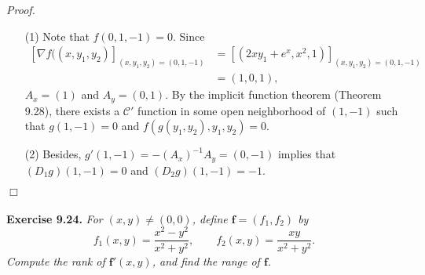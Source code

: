 \documentclass{article}
\begin{document}
\emph{Proof.}
\begin{enumerate}
\item[(1)]
  Note that $f(0,1,-1) = 0$.
  Since
  \begin{align*}
    \left[ \nabla f((x,y_1,y_2) \right]_{(x,y_1,y_2)=(0,1,-1)}
    &= \left[ (2xy_1 + e^x, x^2, 1) \right]_{(x,y_1,y_2)=(0,1,-1)} \\
    &= (1,0,1),
  \end{align*}
  $A_x = (1)$ and $A_y = (0,1)$.
  By the implicit function theorem (Theorem 9.28),
  there exists a $\mathscr{C}'$ function
  in some open neighborhood of $(1,-1)$ such that $g(1,-1) = 0$
  and $f(g(y_1,y_2),y_1,y_2) = 0$.

\item[(2)]
  Besides,
  $g'(1,-1) = -(A_x)^{-1} A_y = (0,-1)$
  implies that $(D_1 g)(1,-1) = 0$ and $(D_2 g)(1,-1) = -1$.

\end{enumerate}
$\Box$ \\\\






\textbf{Exercise 9.24.}
\emph{For $(x,y) \neq (0,0)$, define $\mathbf{f} = (f_1,f_2)$ by
\[
  f_1(x,y) = \frac{x^2-y^2}{x^2+y^2},
  \qquad
  f_2(x,y) = \frac{xy}{x^2+y^2}.
\]
Compute the rank of $\mathbf{f}'(x,y)$, and find the range of $\mathbf{f}$.} \\
\end{document}
